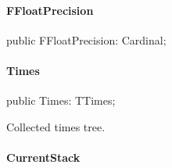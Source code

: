 \documentclass{report}
\begin{document}
\paragraph*{FFloatPrecision}\hspace*{\fill}

\begin{list}{}{
\setlength{\itemindent}{0cm}
\setlength{\listparindent}{0cm}
\setlength{\leftmargin}{\evensidemargin}
\addtolength{\leftmargin}{\tmplength}
\settowidth{\labelsep}{X}
\addtolength{\leftmargin}{\labelsep}
\setlength{\labelwidth}{\tmplength}
}
\begin{flushleft}
\item[\textbf{Declaration}\hfill]
\begin{ttfamily}
public FFloatPrecision: Cardinal;\end{ttfamily}


\end{flushleft}
\end{list}
\paragraph*{Times}\hspace*{\fill}

\begin{list}{}{
\setlength{\itemindent}{0cm}
\setlength{\listparindent}{0cm}
\setlength{\leftmargin}{\evensidemargin}
\addtolength{\leftmargin}{\tmplength}
\settowidth{\labelsep}{X}
\addtolength{\leftmargin}{\labelsep}
\setlength{\labelwidth}{\tmplength}
}
\begin{flushleft}
\item[\textbf{Declaration}\hfill]
\begin{ttfamily}
public Times: TTimes;\end{ttfamily}


\end{flushleft}
\par
\item[\textbf{Description}]
Collected times tree.

\end{list}
\paragraph*{CurrentStack}\hspace*{\fill}
\end{document}
